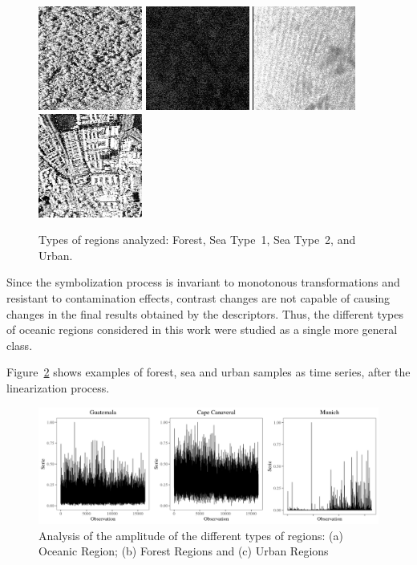 \documentclass[paper=letter, fontsize=12pt]{article}
\begin{document}
\begin{figure}[hbt]
	\centering
	\includegraphics[width=.23\linewidth]{Figures/guatemalaflorest}
	\includegraphics[width=.23\linewidth]{Figures/Cape1}
	\includegraphics[width=.23\linewidth]{Figures/Cape2}
	\includegraphics[width=.23\linewidth]{Figures/munichUrban}	
	\caption{Types of regions analyzed: Forest, Sea Type~1, Sea Type~2, and Urban.}\label{fig:RegionsSAR}
\end{figure} 

Since the symbolization process is invariant to monotonous transformations and resistant to contamination effects, contrast chan\-ges are not capable of causing changes in the final results obtained by the descriptors.
Thus, the different types of oceanic regions considered in this work were studied as a single more general class.

Figure~\ref{fig:AmplitudeSAR} shows examples of forest, sea and urban samples as time series, after the linearization process.

\begin{figure}[hbt]
	\includegraphics[width=\columnwidth]{Figures/SAR_signal.pdf}
	\caption{Analysis of the amplitude of the different types of regions: (a) Oceanic Region; (b) Forest Regions and (c) Urban Regions}
	\label{fig:AmplitudeSAR}
\end{figure} 
\end{document}
